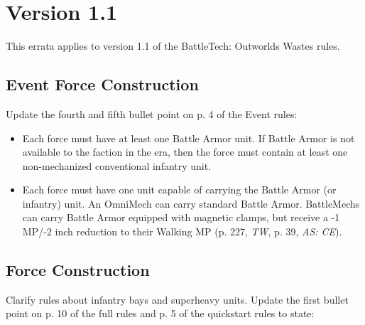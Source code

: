 \section{Version 1.1}

This errata applies to version 1.1 of the BattleTech: Outworlds Wastes rules.

\subsection{Event Force Construction}

Update the fourth and fifth bullet point on p. 4 of the Event rules:

\begin{itemize}

\item Each force must have at least one Battle Armor unit.
If Battle Armor is not available to the faction in the era, then the force must contain at least one non-mechanized conventional infantry unit.

\item Each force must have one unit capable of carrying the Battle Armor (or infantry) unit.
An OmniMech can carry standard Battle Armor.
BattleMechs can carry Battle Armor equipped with magnetic clamps, but receive a -1 MP/-2 inch reduction to their Walking MP (p. 227, \emph{TW}, p. 39, \emph{AS: CE}).

\end{itemize}

\subsection{Force Construction}

Clarify rules about infantry bays and superheavy units.
Update the first bullet point on p. 10 of the full rules and p. 5 of the quickstart rules to state:

